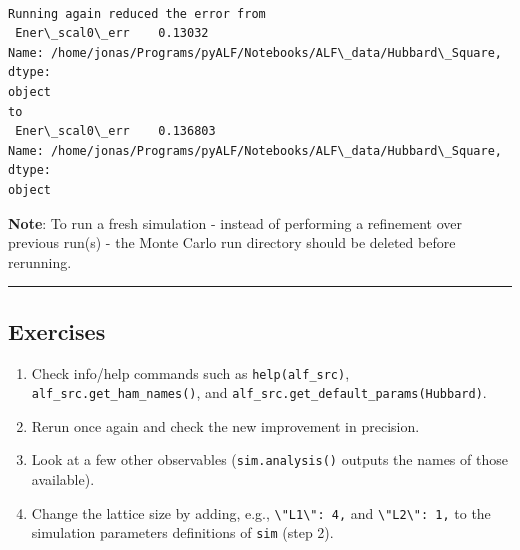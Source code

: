     \begin{Verbatim}[commandchars=\\\{\}]

Running again reduced the error from
 Ener\_scal0\_err    0.13032
Name: /home/jonas/Programs/pyALF/Notebooks/ALF\_data/Hubbard\_Square, dtype:
object
to
 Ener\_scal0\_err    0.136803
Name: /home/jonas/Programs/pyALF/Notebooks/ALF\_data/Hubbard\_Square, dtype:
object
    \end{Verbatim}

    \textbf{Note}: To run a fresh simulation - instead of performing a
refinement over previous run(s) - the Monte Carlo run directory should
be deleted before rerunning.

    \begin{center}\rule{0.5\linewidth}{0.5pt}\end{center}

\hypertarget{exercises}{%
\subsection{Exercises}\label{exercises}}

\begin{enumerate}
\def\labelenumi{\arabic{enumi}.}
\tightlist
\item
  Check info/help commands such as \texttt{help(alf\_src)},
  \texttt{alf\_src.get\_ham\_names()}, and
  \texttt{alf\_src.get\_default\_params(\textquotesingle{}Hubbard\textquotesingle{})}.
\item
  Rerun once again and check the new improvement in precision.
\item
  Look at a few other observables (\texttt{sim.analysis()} outputs the
  names of those available).
\item
  Change the lattice size by adding, e.g.,
  \texttt{\textbackslash{}"L1\textbackslash{}":\ 4,} and
  \texttt{\textbackslash{}"L2\textbackslash{}":\ 1,} to the simulation
  parameters definitions of \texttt{sim} (step 2).
\end{enumerate}


    
    
    
